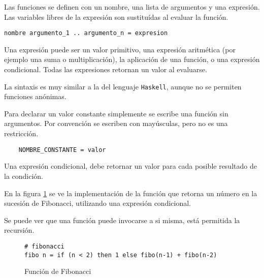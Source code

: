 
  Las funciones se definen con un nombre, una lista de argumentos y una 
expresión. Las variables libres de la expresión son sustituídas al evaluar
la función.

\begin{verbatim}
nombre argumento_1 .. argumento_n = expresion
\end{verbatim}

  Una expresión puede ser un valor primitivo,
una expresión aritmética (por ejemplo una suma o multiplicación),
la aplicación de una función, o una expresión condicional.
  Todas las expresiones retornan un valor al evaluarse.

  La sintaxis es muy similar a la del lenguaje \texttt{Haskell}, aunque
no se permiten funciones anónimas.

  Para declarar un valor constante simplemente se escribe una función sin
argumentos. Por convención se escriben con mayúsculas, pero no es una
restricción.

\begin{verbatim}
    NOMBRE_CONSTANTE = valor
\end{verbatim}

  Una expresión condicional, debe retornar un valor para cada posible
resultado de la condición.

  En la figura \ref{fig:fibo} se ve la implementación
de la función que retorna un número en la sucesión de Fibonacci,
utilizando una expresión condicional.

  Se puede ver que una función puede invocarse a si misma, está permitida
la recursión.

\begin{figure}[h!]
\begin{center}
  \caption{Función de Fibonacci}
  \begin{Verbatim}[frame=single]
# fibonacci
fibo n = if (n < 2) then 1 else fibo(n-1) + fibo(n-2)
  \end{Verbatim}
   \label{fig:fibo}
\end{center}
\end{figure}

